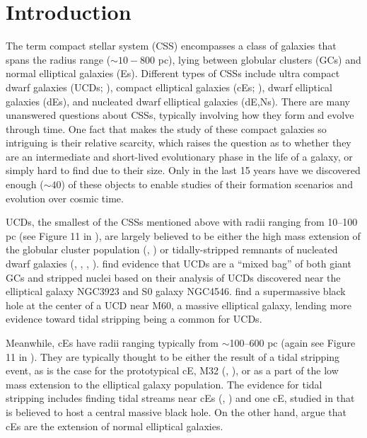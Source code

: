 \documentclass[iop,apj]{emulateapj}
\begin{document}
\maketitle

\section{Introduction}
\label{intro}

\noindent The term compact stellar system (CSS) encompasses a class of galaxies that spans the radius range ($\sim10 - 800$ pc), lying between globular clusters (GCs) and normal elliptical galaxies (Es). Different types of CSSs include ultra compact dwarf galaxies (UCDs; \citet{Phillipps2001}), compact elliptical galaxies (cEs; \citet{Faber1973}), dwarf elliptical galaxies (dEs), and nucleated dwarf elliptical galaxies (dE,Ns).  There are many unanswered questions about CSSs, typically involving how they form and evolve through time. One fact that makes the study of these compact galaxies so intriguing is their relative scarcity, which raises the question as to whether they are an intermediate and short-lived evolutionary phase in the life of a galaxy, or simply hard to find due to their size. Only in the last 15 years have we discovered enough ($\sim 40$) of these objects to enable studies of their formation scenarios and evolution over cosmic time.

UCDs, the smallest of the CSSs mentioned above with radii ranging from 10--100 pc (see Figure 11 in \citet{Norris2014}), are largely believed to be either the high mass extension of the globular cluster population (\citet{Drinkwater2000}, \citet{Mieske2002}) or tidally-stripped remnants of nucleated dwarf galaxies (\citet{Bekki2001}, \citet{Bekki2003}, \citet{Jennings2015}, \citet{Zhang2015}). \citet{Norris2011} find evidence that UCDs are a ``mixed bag'' of both giant GCs and stripped nuclei based on their analysis of UCDs discovered near the elliptical galaxy NGC3923 and S0 galaxy NGC4546. \citet{Seth2014} find a supermassive black hole at the center of a UCD near M60, a massive elliptical galaxy, lending more evidence toward tidal stripping being a common for UCDs.
 
Meanwhile, cEs have radii ranging typically from $\sim$100--600 pc (again see Figure 11 in \citet{Norris2014}). They are typically thought to be either the result of a tidal stripping event, as is the case for the prototypical cE, M32 (\citet{Choi2002}, \citet{Graham2002}), or as a part of the low mass extension to the elliptical galaxy population. The evidence for tidal stripping includes finding tidal streams near cEs (\citet{SmithCastelli2008a}, \citet{Chilingarian2009}) and one cE, studied in \citet{Kormendy1997} that is believed to host a central massive black hole. On the other hand, \citet{Kormendy2012a} argue that cEs are the extension of normal elliptical galaxies.
\end{document}

